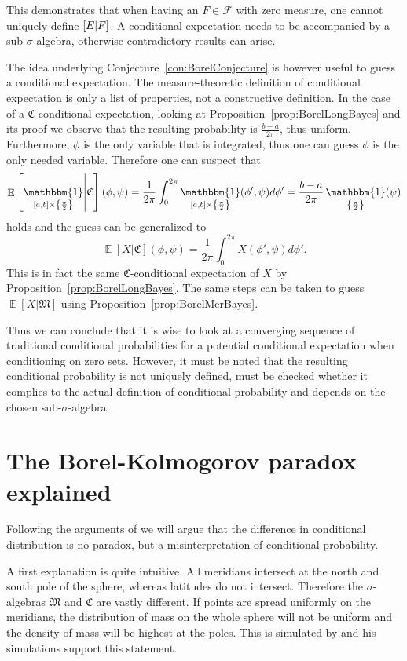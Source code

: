 \documentclass[a4paper]{report}
\theoremstyle{plain}
\theoremstyle{definition}
\theoremstyle{remark}
\numberwithin{equation}{chapter}
\let\P\relax
\DeclareMathOperator{\P}{\mathbb{P}}
\DeclareMathOperator{\E}{\mathbb{E}}
\DeclareMathOperator{\1}{\mathbbm{1}}
\newcommand{\F}{\mathcal{F}}
\begin{document}
This demonstrates that when having an $F\in\F$ with zero measure, one cannot uniquely define $\P[E|F]$. A conditional expectation needs to be accompanied by a sub-$\sigma$-algebra, otherwise contradictory results can arise.

The idea underlying Conjecture~\ref{con:BorelConjecture} is however useful to guess a conditional expectation. The measure-theoretic definition of conditional expectation is only a list of properties, not a constructive definition. In the case of a $\mathfrak{C}$-conditional expectation, looking at Proposition~\ref{prop:BorelLongBayes} and its proof we observe that the resulting probability is $\frac{b-a}{2\pi}$, thus uniform. Furthermore, $\phi$ is the only variable that is integrated, thus one can guess $\phi$ is the only needed variable. Therefore one can suspect that
\begin{equation}
\E\left[\1_{[a,b]\times\left\{\frac{\pi}{2}\right\}}\middle|\mathfrak{C}\right](\phi,\psi)=\frac{1}{2\pi}\int_0^{2\pi}\1_{[a,b]\times\left\{\frac{\pi}{2}\right\}}(\phi',\psi)d\phi'=\frac{b-a}{2\pi}\1_{\left\{\frac{\pi}{2}\right\}}(\psi)
\end{equation}
holds and the guess can be generalized to
\begin{equation}
\E[X|\mathfrak{C}](\phi,\psi)=\frac{1}{2\pi}\int_0^{2\pi}X(\phi',\psi)d\phi'.
\end{equation}
This is in fact the same $\mathfrak{C}$-conditional expectation of $X$ by Proposition~\ref{prop:BorelLongBayes}. The same steps can be taken to guess $\E[X|\mathfrak{M}]$ using Proposition~\ref{prop:BorelMerBayes}.

Thus we can conclude that it is wise to look at a converging sequence of traditional conditional probabilities for a potential conditional expectation when conditioning on zero sets. However, it must be noted that the resulting conditional probability is not uniquely defined, must be checked whether it complies to the actual definition of conditional probability and depends on the chosen sub-$\sigma$-algebra.

\section{The Borel-Kolmogorov paradox explained}\label{sec:BorelExplained}
Following the arguments of \cite{Gyenis17} we will argue that the difference in conditional distribution is no paradox, but a misinterpretation of conditional probability.

A first explanation is quite intuitive. All meridians intersect at the north and south pole of the sphere, whereas latitudes do not intersect. Therefore the $\sigma$-algebras $\mathfrak{M}$ and $\mathfrak{C}$ are vastly different. If points are spread uniformly on the meridians, the distribution of mass on the whole sphere will not be uniform and the density of mass will be highest at the poles. This is simulated by \cite{Weisstein} and his simulations support this statement.
\end{document}
